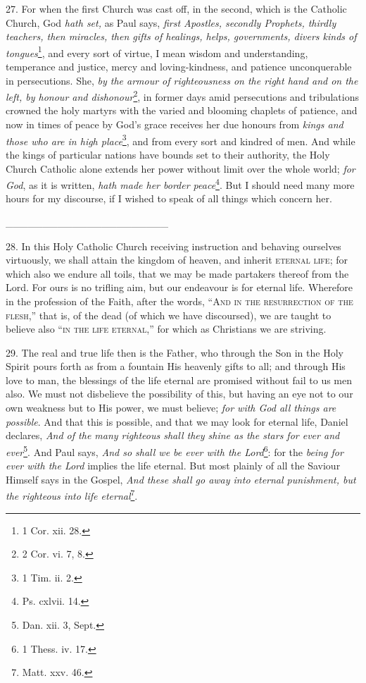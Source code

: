 27. For when the first Church was cast off, in the second, which is the Catholic Church, God \emph{hath set,} as Paul says, \emph{first Apostles, secondly Prophets, thirdly teachers, then miracles, then gifts of healings, helps, governments, divers kinds of tongues}\footnote{1 Cor. xii. 28.}, and every sort of virtue, I mean wisdom and understanding, temperance and justice, mercy and loving-kindness, and patience unconquerable in persecutions. She, \emph{by the armour of righteousness on the right hand and on the left, by honour and dishonour}\footnote{2 Cor. vi. 7, 8.}, in former days amid persecutions and tribulations crowned the holy martyrs with the varied and blooming chaplets of patience, and now in times of peace by God’s grace receives her due honours from \emph{kings and those who are in high place}\footnote{1 Tim. ii. 2.}, and from every sort and kindred of men. And while the kings of particular nations have bounds set to their authority, the Holy Church Catholic alone extends her power without limit over the whole world; \emph{for God}, as it is written, \emph{hath made her border peace}\footnote{Ps. cxlvii. 14.}. But I should need many more hours for my discourse, if I wished to speak of all things which concern her.

\_\_\_\_\_\_\_\_\_\_\_\_\_\_\_\_\_\_\_\_\_\_

28. In this Holy Catholic Church receiving instruction and behaving ourselves virtuously, we shall attain the kingdom of heaven, and inherit \textsc{eternal life}; for which also we endure all toils, that we may be made partakers thereof from the Lord. For ours is no trifling aim, but our endeavour is for eternal life. Wherefore in the profession of the Faith, after the words, “\textsc{And in the resurrection of the flesh},” that is, of the dead (of which we have discoursed), we are taught to believe also “\textsc{in the life eternal},” for which as Christians we are striving.

29. The real and true life then is the Father, who through the Son in the Holy Spirit pours forth as from a fountain His heavenly gifts to all; and through His love to man, the blessings of the life eternal are promised without fail to us men also. We must not disbelieve the possibility of this, but having an eye not to our own weakness but to His power, we must believe; \emph{for with God all things are possible}. And that this is possible, and that we may look for eternal life, Daniel declares, \emph{And of the many righteous shall they shine as the stars for ever and ever}\footnote{Dan. xii. 3, Sept.}. And Paul says, \emph{And so shall we be ever with the Lord}\footnote{1 Thess. iv. 17.}: for the \emph{being for ever with the Lord} implies the life eternal. But most plainly of all the Saviour Himself says in the Gospel, \emph{And these shall go away into eternal punishment, but the righteous into life eternal}\footnote{Matt. xxv. 46.}.

